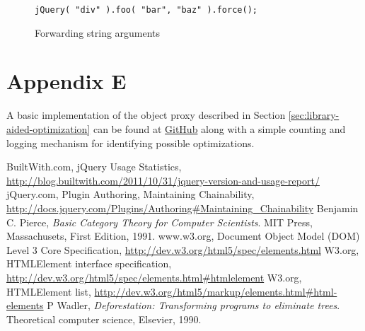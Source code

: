 \documentclass[preprint]{sigplanconf}
\begin{document}
\begin{figure}[!ht]
\small
\begin{verbatim}
jQuery( "div" ).foo( "bar", "baz" ).force();
\end{verbatim}
\nocaptionrule \caption{Forwarding string arguments}
\label{fig:args-juggle}
\end{figure}

\section{Appendix E}

A basic implementation of the object proxy described in Section \ref{sec:library-aided-optimization} can be found at \href{https://github.com/johnbender/jquery-lazy-proxy/blob/79ab61e22547169d6f392512f782df2e29362ebc/lazy.js}{GitHub} along with a simple counting and logging mechanism for identifying possible optimizations.




\begin{thebibliography}{}
\softraggedright

  BuiltWith.com,
  jQuery Usage Statistics,
  \url{http://blog.builtwith.com/2011/10/31/jquery-version-and-usage-report/}
  jQuery.com,
  Plugin Authoring,
  Maintaining Chainability,
  \url{http://docs.jquery.com/Plugins/Authoring#Maintaining_Chainability}
  Benjamin C. Pierce,
  \emph{Basic Category Theory for Computer Scientists}.
  MIT Press, Massachusets,
  First Edition,
  1991.
  www.w3.org,
  Document Object Model (DOM) Level 3 Core Specification,
  \url{http://dev.w3.org/html5/spec/elements.html}
  W3.org,
  HTMLElement interface specification,
  \url{http://dev.w3.org/html5/spec/elements.html#htmlelement}
  W3.org,
  HTMLElement list,
  \url{http://dev.w3.org/html5/markup/elements.html#html-elements}
  P Wadler,
  \emph{Deforestation: Transforming programs to eliminate trees}.
  Theoretical computer science,
  Elsevier,
  1990.

\end{thebibliography}
\end{document}
